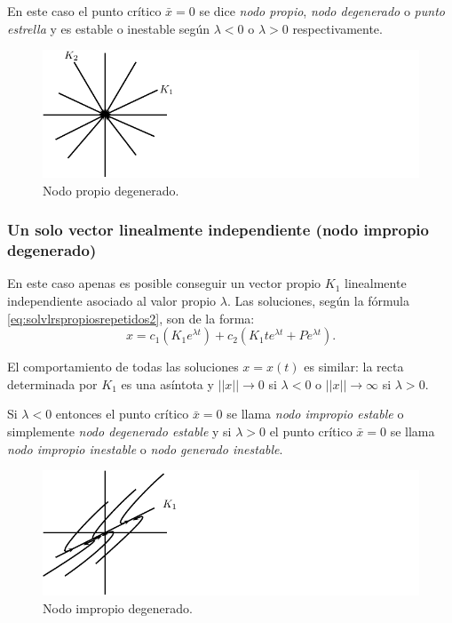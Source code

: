 \documentclass[11pt]{book}
\theoremstyle{definition}
\numberwithin{definition}{section}
\theoremstyle{theorem}
\numberwithin{theorem}{section}
\numberwithin{lemma}{section}
\numberwithin{corollary}{section}
\theoremstyle{plain}
\numberwithin{example}{section}
\begin{document}
En este caso el punto crítico $\bar{x} = 0$ se dice \emph{nodo propio}, \emph{nodo degenerado} o \emph{punto estrella} y es estable o inestable según $\lambda < 0$ o $\lambda > 0$ respectivamente.

\begin{figure}[!ht] \label{fig:nodopropio} \centering
    \includegraphics[scale=1.0]{figures/nodopropio.pdf}
    \caption{Nodo propio degenerado.}
\end{figure}

\subsubsection{Un solo vector linealmente independiente (nodo impropio degenerado)}

En este caso apenas es posible conseguir un vector propio $K_1$ linealmente independiente asociado al valor propio $\lambda$. Las soluciones, según la fórmula \ref{eq:solvlrspropiosrepetidos2}, son de la forma:
$$ x =c_1(K_1 e^{\lambda t}) + c_2(K_1 t e^{\lambda t} + Pe^{\lambda t}). $$

El comportamiento de todas las soluciones $x = x(t)$ es similar: la recta determinada por $K_1$ es una asíntota y $||x|| \to 0$ si $\lambda < 0$ o $||x|| \to \infty$ si $\lambda > 0$.

Si $\lambda < 0$ entonces el punto crítico $\bar{x} = 0$ se llama \emph{nodo impropio estable} o simplemente \emph{nodo degenerado estable} y si $\lambda > 0$ el punto crítico $\bar{x} = 0$ se llama \emph{nodo impropio inestable} o \emph{nodo generado inestable}.

\begin{figure}[!ht] \label{fig:nodoimpropio} \centering
    \includegraphics[scale=1.0]{figures/nodoimpropio.pdf}
    \caption{Nodo impropio degenerado.}
\end{figure}
\end{document}

